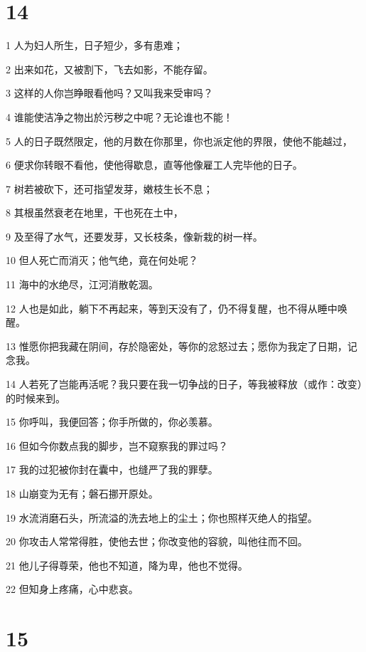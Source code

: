 \chapter{14}

\par 1 人为妇人所生，日子短少，多有患难；
\par 2 出来如花，又被割下，飞去如影，不能存留。
\par 3 这样的人你岂睁眼看他吗？又叫我来受审吗？
\par 4 谁能使洁净之物出於污秽之中呢？无论谁也不能！
\par 5 人的日子既然限定，他的月数在你那里，你也派定他的界限，使他不能越过，
\par 6 便求你转眼不看他，使他得歇息，直等他像雇工人完毕他的日子。
\par 7 树若被砍下，还可指望发芽，嫩枝生长不息；
\par 8 其根虽然衰老在地里，干也死在土中，
\par 9 及至得了水气，还要发芽，又长枝条，像新栽的树一样。
\par 10 但人死亡而消灭；他气绝，竟在何处呢？
\par 11 海中的水绝尽，江河消散乾涸。
\par 12 人也是如此，躺下不再起来，等到天没有了，仍不得复醒，也不得从睡中唤醒。
\par 13 惟愿你把我藏在阴间，存於隐密处，等你的忿怒过去；愿你为我定了日期，记念我。
\par 14 人若死了岂能再活呢？我只要在我一切争战的日子，等我被释放（或作：改变）的时候来到。
\par 15 你呼叫，我便回答；你手所做的，你必羡慕。
\par 16 但如今你数点我的脚步，岂不窥察我的罪过吗？
\par 17 我的过犯被你封在囊中，也缝严了我的罪孽。
\par 18 山崩变为无有；磐石挪开原处。
\par 19 水流消磨石头，所流溢的洗去地上的尘土；你也照样灭绝人的指望。
\par 20 你攻击人常常得胜，使他去世；你改变他的容貌，叫他往而不回。
\par 21 他儿子得尊荣，他也不知道，降为卑，他也不觉得。
\par 22 但知身上疼痛，心中悲哀。

\chapter{15}

